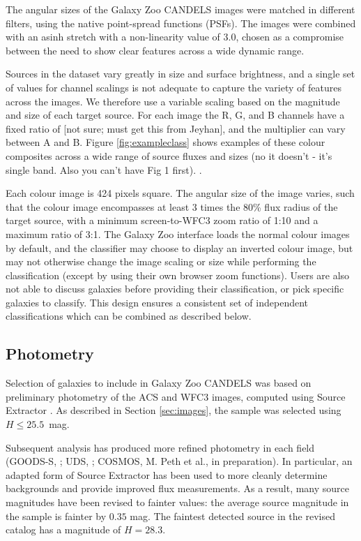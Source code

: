 \documentclass[useAMS,usenatbib]{mn2e}
\def\notebsm	{\color{titlecol}}
\begin{document}
{The angular sizes of the Galaxy Zoo CANDELS images were matched in different filters, using the native point-spread functions (PSFs). The images were combined with an asinh stretch \citep[described in detail in][]{lupton04} with a non-linearity value of {\notebsm 3.0}, chosen as a compromise between the need to show clear features across a wide dynamic range. 

Sources in the dataset vary greatly in size and surface brightness, and a single set of values for channel scalings is not adequate to capture the variety of features across the images. We therefore use a variable scaling based on the {\notebsm magnitude and size} of each target source. For each image the R, G, and B channels have a fixed ratio of {\notebsm [not sure; must get this from Jeyhan]}, and the multiplier can vary between {\notebsm A and B}. Figure \ref{fig:exampleclass} shows examples of these colour composites across a wide range of source fluxes and sizes (no it doesn't - it's single band. Also you can't have Fig 1 first). . 

Each colour image is 424 pixels square. The angular size of the image varies, such that the colour image encompasses at least {\notebsm 3 times the 80\% flux radius of the target source}, with a minimum screen-to-WFC3 zoom ratio of {\notebsm 1:10} and a maximum ratio of {\notebsm 3:1}. The Galaxy Zoo interface loads the normal colour images by default, and the classifier may choose to display an inverted colour image, but may not otherwise change the image scaling or size while performing the classification (except by using their own browser zoom functions). Users are also not able to discuss galaxies before providing their classification, or pick specific galaxies to classify. This design ensures a consistent set of independent classifications which can be combined as described below.



\subsection{Photometry}

Selection of galaxies to include in Galaxy Zoo CANDELS was based on preliminary photometry of the ACS and WFC3 images, computed using Source Extractor \citep{bertin96}. As described in Section \ref{sec:images}, the sample was selected using $H \leq 25.5$~mag. 

Subsequent analysis has produced more refined photometry in each field (GOODS-S, \citeauthor{guo13} \citeyear{guo13}; UDS, \citeauthor{galametz13} \citeyear{galametz13}; COSMOS, M. Peth et al., in preparation). In particular, an adapted form of Source Extractor has been used to more cleanly determine backgrounds and provide improved flux measurements. As a result, many source magnitudes have been revised to fainter values: the average source magnitude in the sample is fainter by $0.35$ mag. The faintest detected source in the revised catalog has a magnitude of $H = 28.3$.

}
\end{document}

